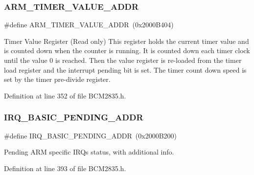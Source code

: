 \subsubsection{\texorpdfstring{A\+R\+M\+\_\+\+T\+I\+M\+E\+R\+\_\+\+V\+A\+L\+U\+E\+\_\+\+A\+D\+DR}{ARM\_TIMER\_VALUE\_ADDR}}
{\footnotesize\ttfamily \#define A\+R\+M\+\_\+\+T\+I\+M\+E\+R\+\_\+\+V\+A\+L\+U\+E\+\_\+\+A\+D\+DR~(0x2000\+B404)}



Timer Value Register (Read only) This register holds the current timer value and is counted down when the counter is running. It is counted down each timer clock until the value 0 is reached. Then the value register is re-\/loaded from the timer load register and the interrupt pending bit is set. The timer count down speed is set by the timer pre-\/divide register. 



Definition at line 352 of file B\+C\+M2835.\+h.

\mbox{\label{group__Peripherals_ga334b052c50be613285e01548f10ea332}} 
\subsubsection{\texorpdfstring{I\+R\+Q\+\_\+\+B\+A\+S\+I\+C\+\_\+\+P\+E\+N\+D\+I\+N\+G\+\_\+\+A\+D\+DR}{IRQ\_BASIC\_PENDING\_ADDR}}
{\footnotesize\ttfamily \#define I\+R\+Q\+\_\+\+B\+A\+S\+I\+C\+\_\+\+P\+E\+N\+D\+I\+N\+G\+\_\+\+A\+D\+DR~(0x2000\+B200)}



Pending A\+RM specific I\+R\+Qs status, with additional info. 



Definition at line 393 of file B\+C\+M2835.\+h.

\mbox{\label{group__Peripherals_ga733b1f250b79a62906eca0763189fc79}} 
